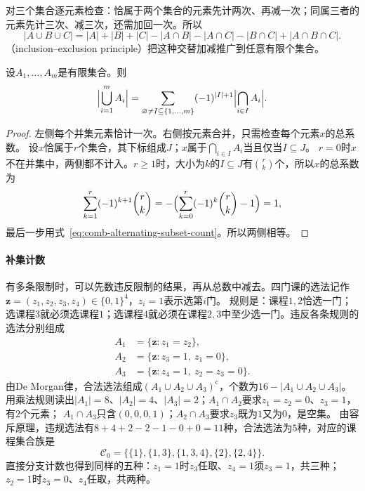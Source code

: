 对三个集合逐元素检查：恰属于两个集合的元素先计两次、再减一次；同属三者的元素先计三次、减三次，还需加回一次。所以
\[
 |A\cup B\cup C|=|A|+|B|+|C|-|A\cap B|-|A\cap C|-|B\cap C|+|A\cap B\cap C|.
\]
（inclusion--exclusion principle）把这种交替加减推广到任意有限个集合。
\begin{theorem}[有限容斥原理]
\label{thm:comb-inclusion-exclusion}
设$A_1,\ldots,A_m$是有限集合。则
\begin{equation}
  \Bigl|\bigcup_{i=1}^{m}A_i\Bigr|
  =\sum_{\varnothing\neq I\subseteq\{1,\ldots,m\}}(-1)^{|I|+1}\Bigl|\bigcap_{i\in I}A_i\Bigr|.
  \label{eq:comb-inclusion-exclusion}
\end{equation}
\end{theorem}
\begin{proof}
左侧每个并集元素恰计一次。右侧按元素合并，只需检查每个元素$x$的总系数。
设$x$恰属于$r$个集合，其下标组成$J$；$x$属于$\bigcap_{i\in I}A_i$当且仅当$I\subseteq J$。
$r=0$时$x$不在并集中，两侧都不计入。$r\geq1$时，大小为$k$的$I\subseteq J$有$\binom rk$个，所以$x$的总系数为
\[
 \sum_{k=1}^r(-1)^{k+1}\binom rk=-\Bigl(\sum_{k=0}^r(-1)^k\binom rk-1\Bigr)=1,
\]
最后一步用式~\eqref{eq:comb-alternating-subset-count}。所以两侧相等。
\end{proof}

\paragraph{补集计数}
有多条限制时，可以先数违反限制的结果，再从总数中减去。四门课的选法记作$\bm z=(z_1,z_2,z_3,z_4)\in\{0,1\}^4$，$z_i=1$表示选第$i$门。
规则是：课程$1,2$恰选一门；选课程$3$就必须选课程$1$；选课程$4$就必须在课程$2,3$中至少选一门。违反各条规则的选法分别组成
\[
 \begin{aligned}
 A_1&=\{\bm z:z_1=z_2\},\\
 A_2&=\{\bm z:z_3=1,\ z_1=0\},\\
 A_3&=\{\bm z:z_4=1,\ z_2=z_3=0\}.
 \end{aligned}
\]
由De Morgan律，合法选法组成$(A_1\cup A_2\cup A_3)^{\mathrm c}$，个数为$16-|A_1\cup A_2\cup A_3|$。
用乘法规则读出$|A_1|=8$、$|A_2|=4$、$|A_3|=2$；$A_1\cap A_2$要求$z_1=z_2=0$、$z_3=1$，有$2$个元素；
$A_1\cap A_3$只含$(0,0,0,1)$；$A_2\cap A_3$要求$z_3$既为$1$又为$0$，是空集。
由容斥原理，违规选法有$8+4+2-2-1-0+0=11$种，合法选法为$5$种，对应的课程集合族是
\begin{equation}
 \mathcal C_0=\bigl\{\{1\},\{1,3\},\{1,3,4\},\{2\},\{2,4\}\bigr\}.
 \label{eq:comb-running-feasible-family}
\end{equation}
直接分支计数也得到同样的五种：$z_1=1$时$z_3$任取、$z_4=1$须$z_3=1$，共三种；$z_2=1$时$z_3=0$、$z_4$任取，共两种。

